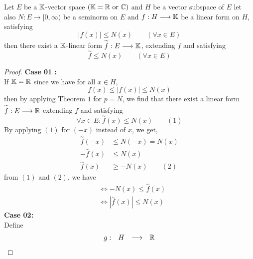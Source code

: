 % 
% 

\lecday[2025-05-08]

% 

\begin{theorem}
	Let $E $ be a $\mathbb{K} $-vector space $(\mathbb{K} = \mathbb{R} \text{ or } \mathbb{C} )  $  
	and $H $ be a vector subspace of $E $ let 
	also 
	$ N : E \longrightarrow [0,\infty) $ 
	be a seminorm on $E $ and 
	$ f : H \longrightarrow \mathbb{K} $ be a linear
	form on $H $, satisfying 
	\[
	\left| f(x)  \right| \leq N(x)  \quad \quad 
	(\forall  x \in  E) 
	\] 
	then there exist a $\mathbb{K} $-linear form 
	$ \overset{\sim}{f}  : E \longrightarrow \mathbb{K} $,
	extending $f $ and satisfying 
	\[
	\overset{\sim}{f} \leq N(x) \quad \quad (\forall  x \in  E)
	\]
\end{theorem}
\begin{proof}
\textbf{Case 01 :} \\
If $\mathbb{K} = \mathbb{R} $  
since we have for all $x \in  H $, 
\[
f(x) \leq \left| f(x)  \right| \leq N(x) 
\]
then by applying Theorem $1 $ for 
$p = N $, we find that there exist a linear form
$ \overset{\sim}{f}  :  E \longrightarrow  \mathbb{R} $ 
extending $f $ and satisfying 
\[
\forall x \in  E : 
\overset{\sim}{f} (x)  \leq  N(x)  \quad \quad  (1) 
\]
By applying $(1)$ for $(-x)  $   instead of $x$, we get, 
\begin{align*}
	\overset{\sim}{f} (-x) &\leq  N(-x) = N(x)   \\
	- \overset{\sim}{f} (x)  &\leq 
	N(x) \\
	\overset{\sim}{f} (x)  & \geq 
- N(x)  \quad  \quad  (2) 
\end{align*}
from $(1)$ and $(2)$, we have 
\begin{align*}
	&\iff  - N(x)  \leq  \overset{\sim}{f} (x)   \\
	&\iff  \left| \overset{\sim}{f} (x)  \right| \leq 
	N(x) 
\end{align*}
\textbf{Case 02: } \\
Define 
\[
\begin{array}{cccc}
      g : &  H  & \longrightarrow & \mathbb{R}  \\


\end{array}\]
\end{proof}
